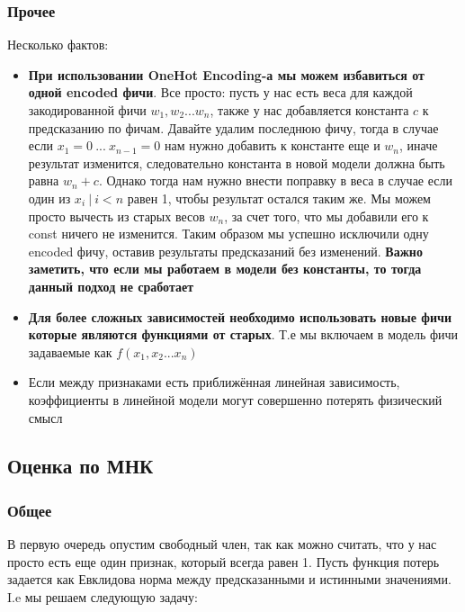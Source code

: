 \documentclass{article}
\begin{document}
    \subsubsection{Прочее}

    Несколько фактов:

    \begin{itemize}
        \item \textbf{При использовании OneHot Encoding-а мы можем избавиться от одной encoded фичи}.
        Все просто: пусть у нас есть веса для каждой закодированной фичи $w_{1}, w_{2} ... w_{n}$, также у нас добавляется константа $c$
        к предсказанию по фичам.
        Давайте удалим последнюю фичу, тогда в случае если $x_{1} = 0 \ ... \ x_{n-1} = 0$ нам нужно добавить к константе еще и $w_{n}$, иначе результат изменится, следовательно
        константа в новой модели должна быть равна $w_{n} + c$. 
        Однако тогда нам нужно внести поправку в веса в случае если один из $x_{i} \ | \ i < n$ равен 1, чтобы
        результат остался таким же. 
        Мы можем просто вычесть из старых весов $w_{n}$, за счет того, что мы добавили его к const ничего не изменится.
        Таким образом мы успешно исключили одну encoded фичу, оставив результаты предсказаний без изменений. 
        \textbf{Важно заметить, что если мы работаем в модели без константы, то тогда данный подход не сработает}
        \item \textbf{Для более сложных зависимостей необходимо использовать новые фичи которые являются функциями от старых}.
        Т.е мы включаем в модель фичи задаваемые как $f(x_{1}, x_{2} ... x_{n})$
        \item Если между признаками есть приближённая линейная зависимость, коэффициенты в линейной модели могут совершенно потерять физический смысл
  
    \end{itemize}
    
    \subsection{Оценка по МНК}

    \subsubsection{Общее}

    В первую очередь опустим свободный член, так как можно считать, что у нас просто есть еще один признак, который всегда равен 1.
    Пусть функция потерь задается как Евклидова норма между предсказанными и истинными значениями.
    I.e мы решаем следующую задачу:
\end{document}
